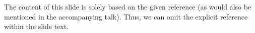 \documentclass[11pt,a4paper]{article}
\begin{document}
\begin{goodexample}
  \begin{figure}[H]
    \centering%
    {%
      \setlength{\fboxsep}{0pt}%
      \setlength{\fboxrule}{2pt}%
    }
  \end{figure}
  
  The content of this slide is solely based on the given reference (as would also be mentioned in the accompanying talk). Thus, we can omit the explicit reference within the slide text.
\end{goodexample}
\end{document}
